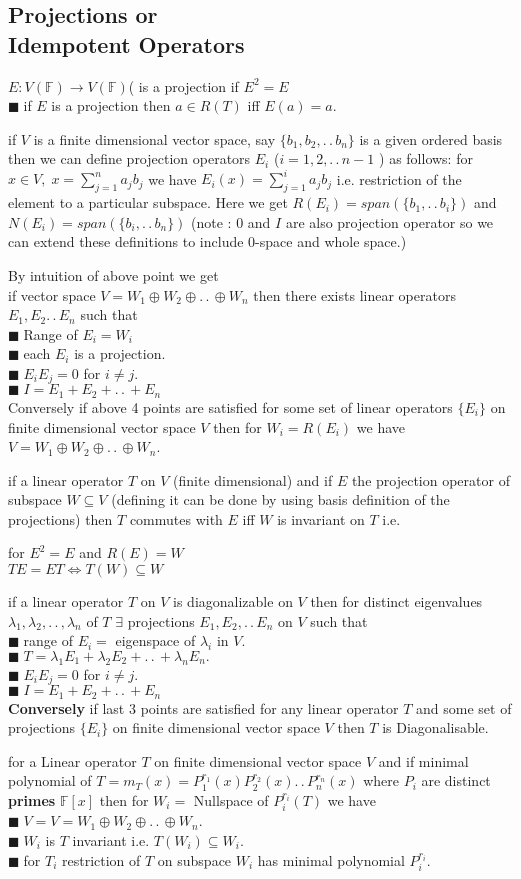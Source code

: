 \documentclass[11pt]{extarticle}
\newcommand{\F}{\mathbb{F}}
\newcommand{\ra}{\rightarrow}
\newcommand{\ck}{.\,.\,}
\newcommand{\snote}[1]{{\footnotesize(#1)}}
\newcommand{\tbx}[2][]{
	\begin{tcolorbox}[enhanced,breakable,size=small,colback=black!2!white,title={#1},arc is angular, arc=1.5mm,drop fuzzy shadow]
		#2
	\end{tcolorbox}
}
\newcommand{\yi}{\\$\blacksquare\;$}
\begin{document}
\begin{multicols}{2}
\section{Projections or \\ Idempotent Operators }
\tbx[Projections]{ $ E: V(\F)\ra V(\F) $( is a projection if $ E^2=E $ 
\yi if $ E $ is a projection then $ a\in R(T) $ iff $ E(a)=a. $  }
\tbx{ if $ V $ is a finite dimensional vector space, say $ \{b_1,b_2,\ck b_n\} $ is a given ordered basis then we can define projection operators $ E_i $ \snote{$ i=1,2,\ck n-1 $ } as follows: for $x\in V,\; x= \sum\limits_{j=1}^{n}a_jb_j $ we have 
 $ E_i(x)=\sum\limits_{j=1}^{i} a_jb_j$  i.e. restriction of the element to a particular subspace. Here we get $ R(E_i)=span(\{b_1,\ck b_i\}) $ and $ N(E_i) =span(\{b_i,\ck b_n\})$ \snote{note : $ 0 $ and $ I $ are also projection operator so we can extend these definitions to include 0-space and whole space.} }
 \tbx{ By intuition of above point we get \\
  if vector space $ V=W_1\oplus W_2 \oplus \ck \oplus W_n $ then there exists linear operators $ E_1,E_2\ck E_n $ such that
  \yi Range of $ E_i = W_i$ 
  \yi each $ E_i $ is a projection.
  \yi $ E_iE_j=0 $ for $ i\neq j. $ 
  \yi $ I=E_1+E_2+\ck +E_n $ \\
  Conversely if above 4 points are satisfied for some set of linear operators $ \{E_i\} $ on finite dimensional vector space $ V $ then for $ W_i=R(E_i) $ we have $ V= W_1\oplus W_2 \oplus \ck \oplus W_n$.}
  \tbx{ if a linear operator $ T $ on $ V $ \snote{finite dimensional} and if $ E $ the projection operator of subspace $ W\subseteq V $ \snote{defining it can be done by using basis definition of the projections}  then $ T $ commutes with $ E $ iff $ W$ is invariant on $ T $ i.e. 
  	 \begin{center}
  	 for $ E^2=E$ and  $ R(E)=W $\\
  $ TE=ET \iff T(W)\subseteq W $
  	 	\end{center} }
   	\tbx[Diagonalizability and Projections]{ if a linear operator $ T $ on $ V $  is diagonalizable on  $ V $ then for distinct eigenvalues $ \lambda_1,\lambda_2,\ck, \lambda_n$ of $ T $ $ \exists $ projections $ E_1,E_2,\ck E_n $ on $ V $ such that
   	\yi range of $ E_i = $ eigenspace of $ \lambda_i $ in $ V $.
   	\yi $ T=\lambda_1 E_1+\lambda_2 E_2 +\ck +\lambda_n E_n .$
   	\yi $ E_iE_j=0 $ for $ i\neq j $.
   	\yi $ I=E_1+E_2+\ck +E_n $ \\
   	  \textbf{Conversely} if last 3 points are satisfied for any linear operator $ T $ and some set of projections $ \{E_i\} $ on finite dimensional vector space $ V $ then $ T $ is Diagonalisable.}
   	  \tbx[Primary Decomposition Theorem]{ for a Linear operator $ T $ on finite dimensional vector space $ V $ and if minimal polynomial of $ T =m_T(x)=P_1^{r_1}(x)P_2^{r_2}(x)\ck P_n^{r_n}(x)$ where $ P_i $ are distinct \textbf{primes} $ \F[x] $ then for $ W_i = $ Nullspace of $ P_i^{r_i}(T) $ we have
   	  \yi $ V=   V= W_1\oplus W_2 \oplus \ck \oplus W_n$. 
   	  \yi $ W_i $ is $ T $ invariant i.e. $ T(W_i)\subseteq W_i. $ 
   	  \yi for $ T_i $ restriction of $ T $ on subspace $ W_i $ has minimal polynomial $ P_i^{r_i} $.}

\end{multicols}
\end{document}
